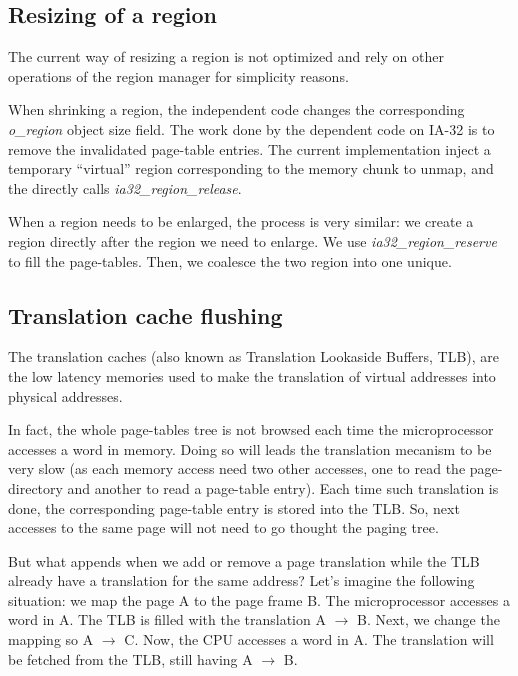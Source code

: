 %
%

\subsection{Resizing of a region}

The current way of resizing a region is not optimized and rely on
other operations of the region manager for simplicity reasons.

When shrinking a region, the independent code changes the
corresponding \textit{o\_region} object size field. The work done by
the dependent code on IA-32 is to remove the invalidated page-table
entries. The current implementation inject a temporary ``virtual''
region corresponding to the memory chunk to unmap, and the directly
calls \textit{ia32\_region\_release}.

When a region needs to be enlarged, the process is very similar: we
create a region directly after the region we need to enlarge. We use
\textit{ia32\_region\_reserve} to fill the page-tables. Then, we
coalesce the two region into one unique.

%
%

\subsection{Translation cache flushing}

The translation caches (also known as Translation Lookaside Buffers,
TLB), are the low latency memories used to make the translation of
virtual addresses into physical addresses.

In fact, the whole page-tables tree is not browsed each time the
microprocessor accesses a word in memory. Doing so will leads the
translation mecanism to be very slow (as each memory access need two
other accesses, one to read the page-directory and another to read a
page-table entry). Each time such translation is done, the
corresponding page-table entry is stored into the TLB. So, next accesses
to the same page will not need to go thought the paging tree.

But what appends when we add or remove a page translation while the TLB
already have a translation for the same address? Let's imagine the
following situation: we map the page A to the page frame B. The
microprocessor accesses a word in A. The TLB is filled with the
translation A $\rightarrow$ B. Next, we change the mapping so A
$\rightarrow$ C. Now, the CPU accesses a word in A. The translation
will be fetched from the TLB, still having A $\rightarrow$ B.

